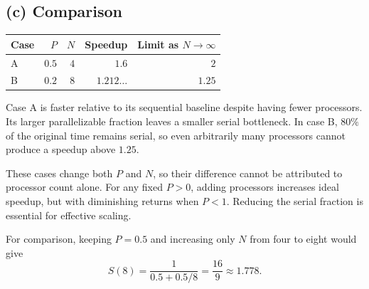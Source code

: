 \documentclass[11pt,a4paper]{article}
\begin{document}
\subsection*{(c) Comparison}
\begin{center}
\begin{tabular}{@{}lrrrr@{}}
\toprule
Case & $P$ & $N$ & Speedup & Limit as $N\to\infty$\\
\midrule
A & $0.5$ & $4$ & $1.6$ & $2$\\
B & $0.2$ & $8$ & $1.212\ldots$ & $1.25$\\
\bottomrule
\end{tabular}
\end{center}
Case A is faster relative to its sequential baseline despite having fewer
processors. Its larger parallelizable fraction leaves a smaller serial
bottleneck. In case B, $80\%$ of the original time remains serial, so even
arbitrarily many processors cannot produce a speedup above $1.25$.

These cases change both $P$ and $N$, so their difference cannot be attributed
to processor count alone. For any fixed $P>0$, adding processors increases
ideal speedup, but with diminishing returns when $P<1$.
Reducing the serial fraction is essential for effective scaling.

For comparison, keeping $P=0.5$ and increasing only $N$ from four to eight
would give
\[
  S(8)=\frac{1}{0.5+0.5/8}=\frac{16}{9}\approx1.778.
\]
\end{document}
